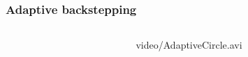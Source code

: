 %
\begin{frame}
\frametitle{Adaptive backstepping}
%
\begin{columns}
\begin{column}{0.4\textwidth}
\end{column}
\begin{column}{0.6\textwidth}
	\begin{center}
		{video/AdaptiveCircle.avi}
	\end{center}
\end{column}
\end{columns}
\end{frame}
%
